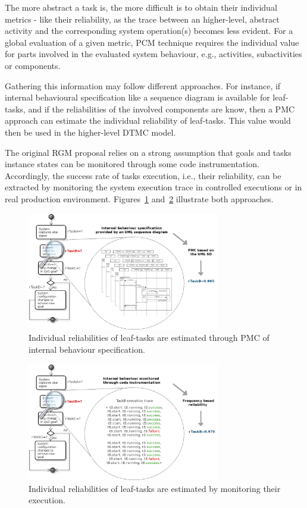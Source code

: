 The more abstract a task is, the more difficult is to 
obtain their individual metrics - like their reliability, as the trace between an higher-level, abstract activity and the corresponding system operation(s) becomes less evident. For a global evaluation of a given metric, PCM technique requires the individual value for parts involved in the evaluated system behaviour, e.g., activities, subactivities or components.

Gathering this information may follow different approaches. For instance, if internal behavioural specification like a sequence diagram is available for leaf-tasks, and if the reliabilities of the involved components are know, then a PMC approach can estimate the individual reliability of leaf-tasks. This value would then be used in the higher-level DTMC model. 

The original RGM proposal relies on a strong assumption that goals and tasks instance states can be monitored through some code instrumentation. Accordingly, the success rate of tasks execution, i.e., their reliability, can be extracted by monitoring the system execution trace in controlled executions or in real production environment. Figures~\ref{fig:MD_PMC} and~\ref{fig:MON_PMC} illustrate both approaches.

\begin{figure}[ht!]
\centering
\includegraphics[width=0.75\textwidth]{imgs/MD_PMC.png}
\caption{Individual reliabilities of leaf-tasks are estimated through PMC of internal behaviour specification.}
\label{fig:MD_PMC}
\end{figure}

\begin{figure}[ht!]
\centering
\includegraphics[width=0.75\textwidth]{imgs/MON_PMC.png}
\caption{Individual reliabilities of leaf-tasks are estimated by monitoring their execution.}
\label{fig:MON_PMC}
\end{figure}


